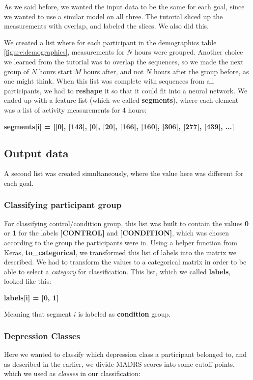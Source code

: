 As we said before, we wanted the input data to be the same for each goal, since we wanted to use a similar model on all three.
The tutorial \cite{1d_cnn} sliced up the measurements with overlap, and labeled the slices. We also did this.

We created a list where for each participant in the demographics table \ref{figure:demographics}, measurements for $N$ hours were grouped. 
Another choice we learned from the tutorial was to overlap the sequences, so we made the next group of $N$ hours start \textit{$M$} hours after, 
and not \textit{$N$} hours after the group before, as one might think. When this list was complete with sequences from all participants, we 
had to \textbf{reshape} it so that it could fit into a neural network. We ended up with a feature list (which we called \textbf{segments}), 
where each element was a list of activity measurements for 4 hours: 

\textbf{segments[i] = [[0], [143], [0], [20], [166], [160], [306], [277], [439], ...]}

\subsection{Output data}

A second list was created simultaneously, where the value here was different for each goal. 

\subsubsection{Classifying participant group}

For classifying control/condition group, this list was built to contain the values \textbf{0} or \textbf{1} for the labels \textbf{[CONTROL]} and \textbf{[CONDITION]}, which was chosen according to the group the participants were in. Using a helper function from Keras, \textbf{to\_categorical}, we transformed this list of labels into the matrix we described. We had to transform the values to a categorical matrix in order to be able to select a \textit{category} for classification. This list, which we called \textbf{labels}, looked like this: 

\textbf{labels[i] = [0, 1]}

\noindent Meaning that segment $i$ is labeled as \textbf{condition} group.

\subsubsection{Depression Classes}
Here we wanted to classify which depression class a participant belonged to, and as described in the earlier, we divide MADRS scores into some cutoff-points, which we used as \textit{classes} in our classification:

